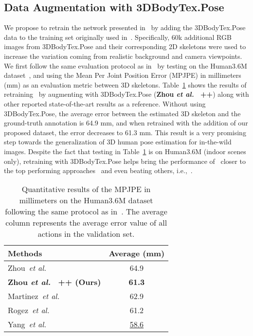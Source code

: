 \documentclass{article}
\begin{document}
\vspace{-0.1cm}
\subsection{Data Augmentation with 3DBodyTex.Pose}
\vspace{-0.1cm}
We propose to retrain the network presented in~\cite{zhou2017towards} by adding the 3DBodyTex.Pose data to the training set originally used in~\cite{zhou2017towards}. Specifically, 60k additional RGB images from 3DBodyTex.Pose and their corresponding 2D skeletons were used to increase the variation coming from realistic background and camera viewpoints. \\
We first follow the same evaluation protocol as in~\cite{zhou2017towards} by testing on the Human3.6M dataset~\cite{h36m_pami}, and using the Mean Per Joint Position Error (MPJPE) in millimeters (mm) as an evaluation metric between 3D skeletons.
Table~\ref{tab:h36m_avg_results} shows the results of retraining~\cite{zhou2017towards} by augmenting with 3DBodyTex.Pose (\textbf{Zhou \textit{et al.}~\cite{zhou2017towards} ++}) along with other reported state-of-the-art results as a reference.
 Without using 3DBodyTex.Pose, the average error between the estimated 3D skeleton and the ground-truth annotation is 64.9 mm, and when retrained with the addition of our proposed dataset, the error decreases to 61.3 mm. This result is a very promising step towards the generalization of 3D human pose estimation for in-the-wild images. Despite the fact that testing in Table~\ref{tab:h36m_avg_results} is on Human3.6M (indoor scenes only), retraining with 3DBodyTex.Pose helps bring the performance of~\cite{zhou2017towards} closer to the top performing approaches~\cite{rogez2019lcr,yang20183d} and even beating others, i.e.,~\cite{martinez2017simple}. 
 


\begin{table}[t]
\centering
\begin{tabular}{l|c} 
\hline
Methods & Average (mm)  \\ 
\hline
Zhou~\textit{et al.}~\cite{zhou2017towards}                       &  64.9  
\\
\textbf{Zhou \textit{et al.}~\cite{zhou2017towards} ++ (Ours)}         &  \textbf{61.3}  
\\
\hline
\hline
Martinez~\textit{et al.}~\cite{martinez2017simple}                &  62.9   \\
Rogez~\textit{et al.}~\cite{rogez2019lcr}                         &  61.2   \\
Yang~\textit{et al.}~\cite{yang20183d}                            &  \underline{58.6}   \\
\end{tabular}
\caption{Quantitative results of the MPJPE in millimeters on the Human3.6M dataset following the same protocol as in~\cite{zhou2017towards}. The average column represents the average error value of all actions in the validation set.}
\label{tab:h36m_avg_results}
\end{table}
\end{document}
